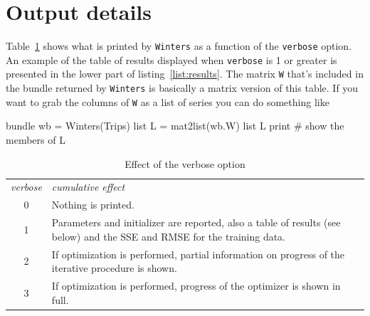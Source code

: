 \documentclass{article}
\begin{document}
\section{Output details}
\label{sec:out}

Table~\ref{tab:verbose} shows what is printed by \texttt{Winters} as a
function of the \texttt{verbose} option. An example of the table of
results displayed when \texttt{verbose} is 1 or greater is presented
in the lower part of listing~\ref{list:results}. The matrix \texttt{W}
that's included in the bundle returned by \texttt{Winters} is
basically a matrix version of this table. If you want to grab the
columns of \texttt{W} as a list of series you can do something like
\begin{nscode}
bundle wb = Winters(Trips)
list L = mat2list(wb.W)
list L print # show the members of L
\end{nscode}

\begin{table}[htbp]
  \caption{Effect of the verbose option}
  \label{tab:verbose}
  \begin{tabular}{cp{4.5in}}
    \textit{verbose} & \textit{cumulative effect} \\[6pt]
    0 & Nothing is printed. \\
    1 & Parameters and initializer are reported, also a table
        of results (see below) and the SSE and RMSE for the
        training data.\\
    2 & If optimization is performed, partial information on
        progress of the iterative procedure is shown. \\
    3 & If optimization is performed, progress of the
        optimizer is shown in full.
  \end{tabular}
\end{table}
\end{document}
